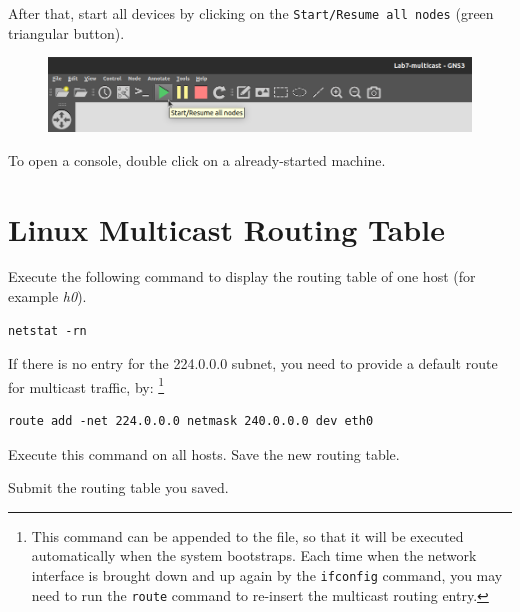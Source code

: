 \documentclass{../UTNetLab}
\begin{document}
    After that, start all devices by clicking on the \texttt{Start/Resume all nodes} (green triangular button).
    \begin{figure}[H]
        \centering
        \includegraphics[scale=1.6]{img/start-all}
    \end{figure}

    To open a console, double click on a already-started machine.


\section{Linux Multicast Routing Table\label{sec:rt}}
\label{sec:linux-multicast-routing}
    Execute the following command to display the routing table of one host (for example \textit{h0}).
    \begin{lstlisting}
netstat -rn
    \end{lstlisting}
    
    If there is no entry for the 224.0.0.0 subnet, you need to provide a default route for multicast traffic, by:
    \footnote{This command can be appended to the  file, so that it will be executed automatically when the system bootstraps. Each time when the network interface is brought down and up again by the \lstinline{ifconfig} command, you may need to run the \lstinline{route} command to re-insert the multicast routing entry.}
    \begin{lstlisting}[emph=eth0]
route add -net 224.0.0.0 netmask 240.0.0.0 dev eth0
    \end{lstlisting}
    
    Execute this command on all hosts.
    Save the new routing table.
    
    \begin{report}
    \item Submit the routing table you saved.
    \end{report}
\end{document}
